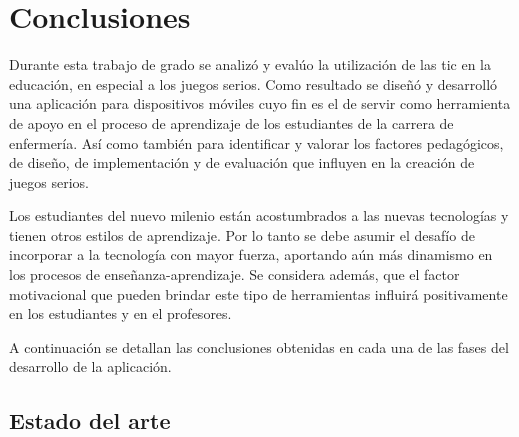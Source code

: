 \section{Conclusiones}

Durante esta trabajo de grado se analizó y evalúo la utilización de las
\Gls{tic} en la educación, en especial a los juegos serios. Como resultado se
diseñó y desarrolló una aplicación para dispositivos móviles cuyo fin es el de
servir como herramienta de apoyo en el proceso de aprendizaje de los estudiantes
de la carrera de enfermería. Así como también para identificar y valorar
los factores pedagógicos, de diseño, de implementación y de evaluación que
influyen en la creación de juegos serios.


Los estudiantes del nuevo milenio están acostumbrados a las nuevas tecnologías y
tienen otros estilos de aprendizaje. Por lo tanto se debe asumir el desafío de
incorporar a la tecnología con mayor fuerza, aportando aún más dinamismo en los
procesos de enseñanza-aprendizaje. Se considera además, que el factor motivacional
que pueden brindar este tipo de herramientas influirá positivamente en los
estudiantes y en el profesores.

A continuación se detallan las conclusiones obtenidas en cada una de las fases
del desarrollo de la aplicación.

\subsection{Estado del arte}

